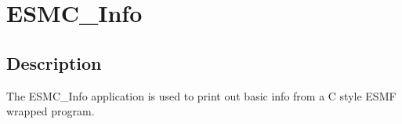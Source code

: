 \section{ESMC\_Info}
\label{sec:ESMC_Info}

\subsection{Description}

The ESMC\_Info application is used to print out basic info from a C style ESMF wrapped program.  
